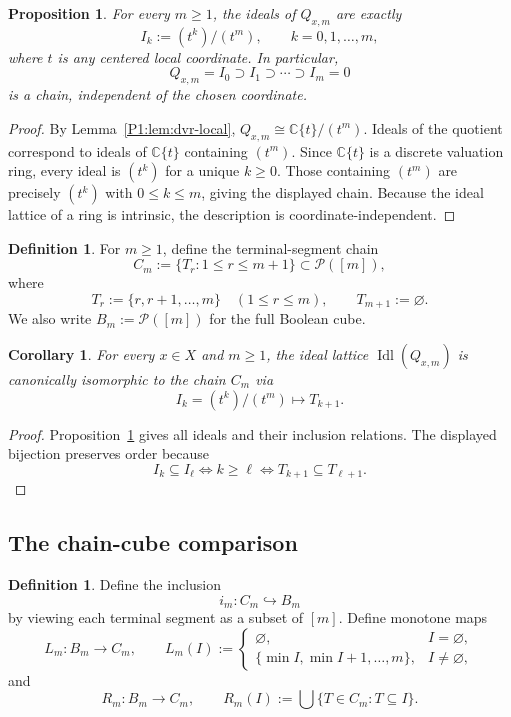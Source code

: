 \documentclass[11pt,a4paper]{article}
\numberwithin{equation}{section}
\newtheorem{proposition}[theorem]{Proposition}
\newtheorem{corollary}[theorem]{Corollary}
\theoremstyle{definition}
\newtheorem{definition}[theorem]{Definition}
\theoremstyle{remark}
\DeclareMathOperator{\Idl}{Idl}
\newcommand{\CC}{\mathbb C}
\newcommand{\cP}{\mathcal P}
\newcommand{\into}{\hookrightarrow}
\begin{document}
\begin{proposition}\label{P1:prop:ideal-chain-local}
For every $m\ge1$, the ideals of $Q_{x,m}$ are exactly
\[
I_k:=(t^k)/(t^m),\qquad k=0,1,\dots,m,
\]
where $t$ is any centered local coordinate.  In particular,
\[
Q_{x,m}=I_0\supset I_1\supset\cdots\supset I_m=0
\]
is a chain, independent of the chosen coordinate.
\end{proposition}

\begin{proof}
By Lemma~\ref{P1:lem:dvr-local}, $Q_{x,m}\cong\CC\{t\}/(t^m)$.  Ideals of the quotient correspond to ideals of $\CC\{t\}$ containing $(t^m)$.  Since $\CC\{t\}$ is a discrete valuation ring, every ideal is $(t^k)$ for a unique $k\ge0$.  Those containing $(t^m)$ are precisely $(t^k)$ with $0\le k\le m$, giving the displayed chain.  Because the ideal lattice of a ring is intrinsic, the description is coordinate-independent.
\end{proof}

\begin{definition}
For $m\ge1$, define the terminal-segment chain
\[
C_m:=\{T_r:1\le r\le m+1\}\subset \cP([m]),
\]
where
\[
T_r:=\{r,r+1,\dots,m\}\quad (1\le r\le m),
\qquad
T_{m+1}:=\varnothing.
\]
We also write $B_m:=\cP([m])$ for the full Boolean cube.
\end{definition}

\begin{corollary}\label{P1:cor:ideal-chain-identification}
For every $x\in X$ and $m\ge1$, the ideal lattice $\Idl(Q_{x,m})$ is canonically isomorphic to the chain $C_m$ via
\[
I_k=(t^k)/(t^m)\longmapsto T_{k+1}.
\]
\end{corollary}

\begin{proof}
Proposition~\ref{P1:prop:ideal-chain-local} gives all ideals and their inclusion relations.  The displayed bijection preserves order because
\[
I_k\subseteq I_\ell\iff k\ge\ell
\iff T_{k+1}\subseteq T_{\ell+1}.
\]
\end{proof}

\subsection{The chain-cube comparison}

\begin{definition}
Define the inclusion
\[
i_m:C_m\into B_m
\]
by viewing each terminal segment as a subset of $[m]$.  Define monotone maps
\[
L_m:B_m\to C_m,
\qquad
L_m(I):=\begin{cases}
\varnothing,& I=\varnothing,\\
\{\min I,\min I+1,\dots,m\},& I\neq\varnothing,
\end{cases}
\]
and
\[
R_m:B_m\to C_m,
\qquad
R_m(I):=\bigcup\{T\in C_m:T\subseteq I\}.
\]
\end{definition}
\end{document}
